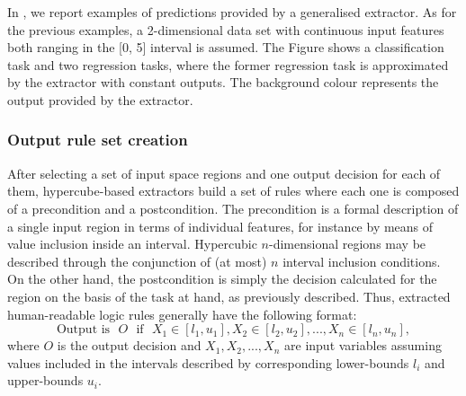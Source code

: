 \documentclass[
]{ceurart}
\begin{document}



In , we report examples of predictions provided by a generalised extractor.
%
As for the previous examples, a 2-dimensional data set with continuous input features both ranging in the [0, 5] interval is assumed.
%
The Figure shows a classification task and two regression tasks, where the former regression task is approximated by the extractor with constant outputs.
%
The background colour represents the output provided by the extractor.

\subsubsection{Output rule set creation}

After selecting a set of input space regions and one output decision for each of them, hypercube-based extractors build a set of rules where each one is composed of a precondition and a postcondition.
%
The precondition is a formal description of a single input region in terms of individual features, for instance by means of value inclusion inside an interval.
%
Hypercubic $n$-dimensional regions may be described through the conjunction of (at most) $n$ interval inclusion conditions.
%
On the other hand, the postcondition is simply the decision calculated for the region on the basis of the task at hand, as previously described.
%
Thus, extracted human-readable logic rules generally have the following format:
%
\begin{equation*}
	\text{Output is ~} O \text{~ if ~} X_1 \in [l_1, u_1], X_2 \in [l_2, u_2], ..., X_n \in [l_n, u_n],
\end{equation*}
%
where $O$ is the output decision and $X_1, X_2, ..., X_n$ are input variables assuming values included in the intervals described by corresponding lower-bounds $l_i$ and upper-bounds $u_i$.
\end{document}
